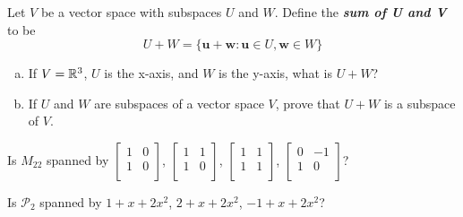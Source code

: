 \documentclass[11pt,letterpaper,boxed]{pset}
\begin{document}
    
    \begin{problem}[6.1 \#48]
    Let $V$ be a vector space with subspaces $U$ and $W$. Define the \textit{\textbf{sum of U and V}} to be
    \[U + W = \{ \textbf{u} + \textbf{w}: \textbf{u} \in U, \textbf{w} \in W \}\]
    \begin{enumerate} [(a)]
        \item If $V=\mathbb{R}^3$, $U$ is the x-axis, and $W$ is the y-axis, what is $U+W$?
        \item If $U$ and $W$ are subspaces of a vector space $V$, prove that $U+W$ is a subspace of $V$.
    \end{enumerate}
    \end{problem}
    \newpage
    
    
    \begin{problem}[6.1 \#60]
    Is $M_{22}$ spanned by 
    $
    \begin{bmatrix}
    1 & 0  \\
    1 & 0 \\
    \end{bmatrix}
    $, 
    $
    \begin{bmatrix}
    1 & 1  \\
    1 & 0 \\
    \end{bmatrix}
    $, 
    $
    \begin{bmatrix}
    1 & 1  \\
    1 & 1 \\
    \end{bmatrix}
    $, 
    $
    \begin{bmatrix}
    0 & -1 \\
    1 & 0 \\
    \end{bmatrix}
    $?
    \end{problem}
    \newpage
    
    
    \begin{problem}[6.1 \#62]
    Is $\mathscr{P}_2$ spanned by $1 + x + 2x^2$, $2 + x + 2x^2$, $-1 + x + 2x^2$?
    \end{problem}
    \newpage
    
\end{document}
